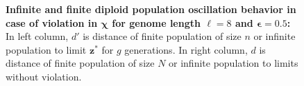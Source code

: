 \begin{figure}[H]
\begin{center}
\hspace{-3em}%
\vspace{-0.5em}  \hspace{-3em}%


\caption{\textbf{Infinite and finite diploid population oscillation behavior in case of violation in $\bm{\chi}$ for genome length $\ell = 8$ and $\bm{\epsilon} = 0.5$:} 
  In left column, $d'$ is distance of finite population of size $n$ or infinite population to limit $\bm{z}^\ast$ for $g$ generations. In right column, $d$ is distance of finite population of size $N$ or infinite population to limits without violation.}
\label{oscillation_8d_vio_chi_0.5}
\end{center}
\end{figure}

